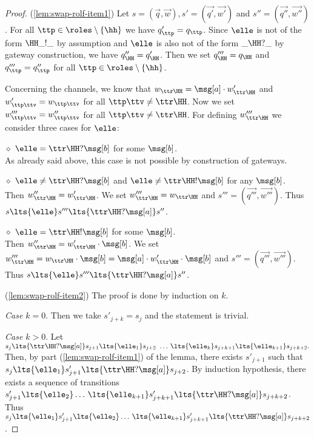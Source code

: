 \begin{proof}
(\ref{lem:swap-rolf-item1})
%
 Let $s = (\vec{q},\vec{w}), s' = (\vec{q'},\vec{w'})$ and
 $s'' = (\vec{q''},\vec{w''})$.
 For all $\ttp \in \roles\setminus\{\hh\}$ we have $q'_\ttp = q_\ttp$.
 Since $\elle$ is not of the form $\HH\_!\_$ by assumption and
$\elle$ is also not of the form $\_\HH?\_$ by gateway construction, we have $q''_\HH = q'_\HH$. 
 Then we set $q'''_\HH = q_\HH$ and $q'''_\ttp = q''_\ttp$ for all
$\ttp \in \roles\setminus\{\hh\}$.

Concerning the channels, we know that $w_{\ttr\HH} =  \msg[a]\cdot w'_{\ttr\HH}$ and $w'_{\ttp\ttv} =  w_{\ttp\ttv}$ for all
$\ttp\ttv \neq \ttr\HH$. 
Now we set $w'''_{\ttp\ttv} =  w''_{\ttp\ttv}$ for all $\ttp\ttv \neq \ttr\HH$. 
For defining $w'''_{\ttr\HH}$ we consider three cases for $\elle$: 
%
\begin{description}
\item \underline{$\diamond$}
$\elle = \ttr\HH?\msg[b]$ for some $\msg[b]$.\\
As already said above, this case is not possible by construction of gateways.

\item \underline{$\diamond$}
$\elle \neq \ttr\HH?\msg[b]$ and $\elle \neq \ttr\HH!\msg[b]$
for any $\msg[b]$.\\
Then $w''_{\ttr\HH} =  w'_{\ttr\HH}$. We set
$w'''_{\ttr\HH} = w_{\ttr\HH}$ and $s''' = (\vec{q'''},\vec{w'''})$. 
Thus $s\lts{\elle}s'''\lts{\ttr\HH?\msg[a]}s''$. 
%
\item
\underline{$\diamond$}
$\elle = \ttr\HH!\msg[b]$ for some $\msg[b]$.\\
Then $w''_{\ttr\HH} = w'_{\ttr\HH}\cdot\msg[b]$.
We set $w'''_{\ttr\HH} = w_{\ttr\HH}\cdot\msg[b] = \msg[a]\cdot w'_{\ttr\HH}\cdot\msg[b]$ and $s''' = (\vec{q'''},\vec{w'''})$.
Thus $s\lts{\elle}s'''\lts{\ttr\HH?\msg[a]}s''$. 
\end{description}

(\ref{lem:swap-rolf-item2}) The proof is done by induction on $k$.

{\em Case $k = 0$}.
Then we take $s'_{j+k} = s_j$ and the statement is trivial. 

{\em Case $k>0$}. %
Let $s_j  \lts{\ttr\HH?\msg[a]} s_{j+1}\lts{\elle_1}s_{j+2}\,\,\ldots\, \lts{\elle_{k}}s_{j+k+1} \lts{\elle_{k+1}}s_{j+k+2}.$
Then, by part (\ref{lem:swap-rolf-item1}) of the lemma, there exists
$s'_{j+1}$ such that $s_j \lts{\elle_1} s'_{j+1}\lts{\ttr\HH?\msg[a]}s_{j+2}$.
By induction hypothesis, there exists a sequence of transitions 
$s'_{j+1}  \lts{\elle_2} \ldots\,  \lts{\elle_{k+1}} s'_{j+k+1} \lts{\ttr\HH?\msg[a]}s_{j+k+2}$. Thus
$s_j \lts{\elle_1} s'_{j+1}  \lts{\elle_2} \ldots\,  \lts{\elle_{k+1}} s'_{j+k+1} \lts{\ttr\HH?\msg[a]}s_{j+k+2}$. 



\end{proof}
